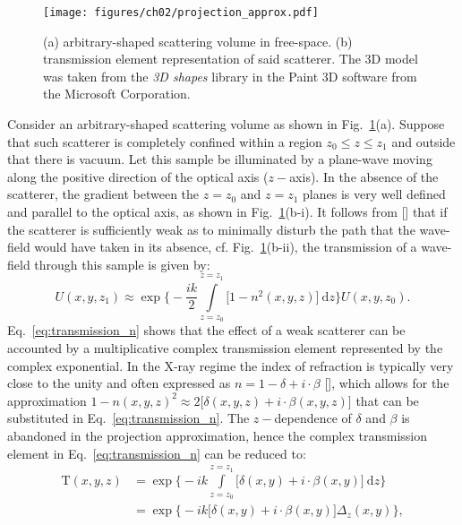 \begin{refsection}
\begin{figure}[t]
    \centering
    {\texttt{[image: figures/ch02/projection\_approx.pdf]}}
    \caption[Transmission elements]{(a) arbitrary-shaped scattering volume in free-space. (b) transmission element representation of said scatterer. The 3D model was taken from the \textit{3D shapes} library in the Paint 3D software from the Microsoft Corporation.}
    \label{fig:projection}
\end{figure}
Consider an arbitrary-shaped scattering volume as shown in Fig.~\ref{fig:projection}(a). Suppose that such scatterer is completely confined within a region $z_0\leq z\leq z_1$ and outside that there is vacuum. Let this sample be illuminated by a plane-wave moving along the positive direction of the optical axis ($z-$axis). In the absence of the scatterer, the gradient between the $z=z_0$ and $z=z_1$ planes is very well defined and parallel to the optical axis, as shown in Fig.~\ref{fig:projection}(b-$\mathrm{i}$). It follows from [\cite[\textit{§2.2}]{Paganin2006}] that if the scatterer is sufficiently weak as to minimally disturb the path that the wave-field would have taken in its absence, cf. Fig.~\ref{fig:projection}(b-$\mathrm{ii}$), the transmission of a wave-field through this sample is given by:
\begin{equation}\label{eq:transmission_n}
    U(x,y,z_1)\approx\exp\Bigg\{-\frac{ik}{2}\int\limits_{z=z_0}^{z=z_1}{\big[1-n^2(x,y,z)\big]~\mathrm{d}z}\Bigg\}U(x,y,z_0).
\end{equation}{}
Eq.~\ref{eq:transmission_n} shows that the effect of a weak scatterer can be accounted by a multiplicative complex transmission element represented by the complex exponential. In the X-ray regime the index of refraction is typically very close to the unity and often expressed as $n=1-\delta+i\cdot\beta$ [\cite[\textit{§1.6}]{Als-Nielsen2011}], which allows for the approximation $1-n(x,y,z)^2\approx2\big[\delta(x,y,z)+i\cdot\beta(x,y,z)\big]$ that can be substituted in Eq.~\ref{eq:transmission_n}. The $z-$dependence of $\delta$ and $\beta$ is abandoned in the projection approximation, hence the complex transmission element in Eq.~\ref{eq:transmission_n} can be reduced to:
\begin{align}\label{eq:transmission}
\mathrm{T}(x,y,z) &=\exp\Bigg\{-ik\int\limits_{z=z_0}^{z=z_1}{\big[\delta(x,y)+i\cdot\beta(x,y)\big]~\mathrm{d}z}\Bigg\}\nonumber\\
         &=\exp\Bigg\{-ik\big[\delta(x,y)+i\cdot\beta(x,y)\big]\Delta_z(x,y)\Bigg\},\nonumber\\

\end{align}
\end{refsection}
